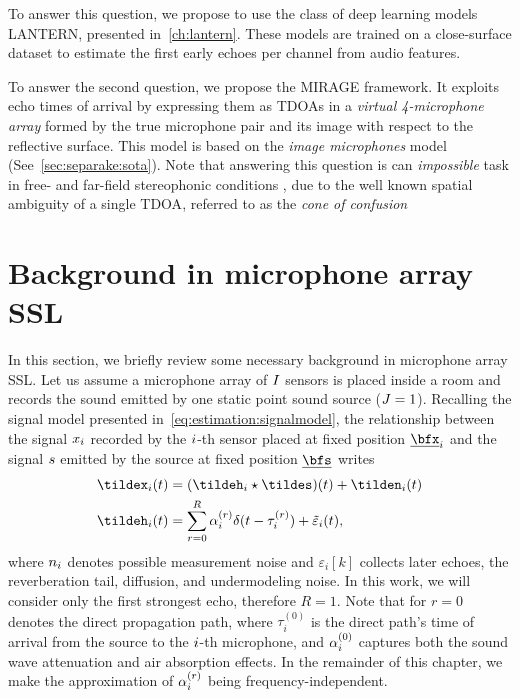 To answer this question, we propose to use the class of deep learning models \acs{LANTERN}, presented in~\cref{ch:lantern}.
These models are trained on a close-surface dataset to estimate the first early echoes per channel from audio features.

To answer the second question, we propose the \acf{MIRAGE} framework.
It exploits echo times of arrival by expressing them as \acp{TDOA} in a \textit{virtual 4-microphone array} formed by the true microphone pair and its image with respect to the reflective surface.
This model is based on the \textit{image microphones} model (See~\cref{sec:separake:sota}).
Note that answering this question is can \textit{impossible} task in free- and far-field stereophonic conditions , due to the well known spatial ambiguity of a single \ac{TDOA}, referred to as the \textit{cone of confusion}~

\section{Background in microphone array SSL}\label{sec:background}
In this section, we briefly review some necessary background in microphone array \ac{SSL}.
Let us assume a microphone array of $I$ sensors is placed inside a room and records the sound emitted by one static point sound source ($J=1$).
Recalling the signal model presented in~\cref{eq:estimation:signalmodel}, the relationship between the signal $x_{i}$ recorded by the $i$-th sensor placed at fixed position $\positionMicrophone_\idxMic$ and the signal $s$ emitted by the source at fixed position $\positionSource$ writes
\begin{equation}\label{eq:mirage:signalmodel}
    \begin{aligned}
        \tildex_i(t) &= (\tildeh_i \convCont \tildes)(t) + \tilden_i(t)\\
        \tildeh_i(t) &= \echoModelTimeSimple{i} + \tilde{\varepsilon}_i(t),
    \end{aligned}
\end{equation}
where $n_{i}$ denotes possible measurement noise and $\varepsilon_i[k]$ collects later echoes, the reverberation tail, diffusion, and undermodeling noise.
In this work, we will consider only the first strongest echo, therefore $R = 1$.
Note that for $r=0$ denotes the direct propagation path, where $\tau_i^(0)$ is the direct path's time of arrival from the source to the $i$-th microphone, and $\alpha^{(0)}_{i}$ captures both the sound wave attenuation and air absorption effects.
In the remainder of this chapter, we make the approximation of $\alpha_i^{(r)}$ being frequency-independent.

